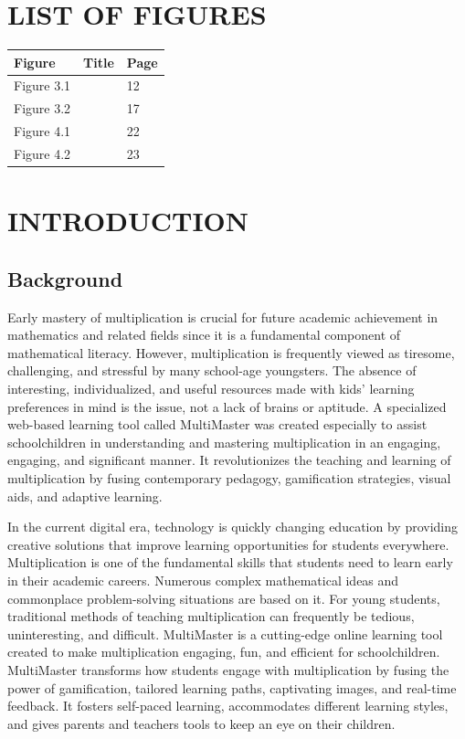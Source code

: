 \documentclass[BTech]{audiss}
\begin{document}
\newpage
\tableofcontents
\newpage
\section*{LIST OF FIGURES}
\begin{tabular}{|l|l|l|}
    \hline
    \textbf{Figure} & \textbf{Title} & \textbf{Page} \\
    \hline
    Figure 3.1 & & 12 \\
    \hline
    Figure 3.2 & & 17 \\
    \hline
    Figure 4.1 & & 22 \\
    \hline
    Figure 4.2 & & 23 \\
    \hline
\end{tabular}
\newpage
\section{INTRODUCTION}
\subsection{Background}
Early mastery of multiplication is crucial for future academic achievement in mathematics and related fields since it is a fundamental component of mathematical literacy. However, multiplication is frequently viewed as tiresome, challenging, and stressful by many school-age youngsters. The absence of interesting, individualized, and useful resources made with kids' learning preferences in mind is the issue, not a lack of brains or aptitude. A specialized web-based learning tool called MultiMaster was created especially to assist schoolchildren in understanding and mastering multiplication in an engaging, engaging, and significant manner. It revolutionizes the teaching and learning of multiplication by fusing contemporary pedagogy, gamification strategies, visual aids, and adaptive learning.

In the current digital era, technology is quickly changing education by providing creative solutions that improve learning opportunities for students everywhere. Multiplication is one of the fundamental skills that students need to learn early in their academic careers. Numerous complex mathematical ideas and commonplace problem-solving situations are based on it. For young students, traditional methods of teaching multiplication can frequently be tedious, uninteresting, and difficult. MultiMaster is a cutting-edge online learning tool created to make multiplication engaging, fun, and efficient for schoolchildren. MultiMaster transforms how students engage with multiplication by fusing the power of gamification, tailored learning paths, captivating images, and real-time feedback. It fosters self-paced learning, accommodates different learning styles, and gives parents and teachers tools to keep an eye on their children.
\end{document}
